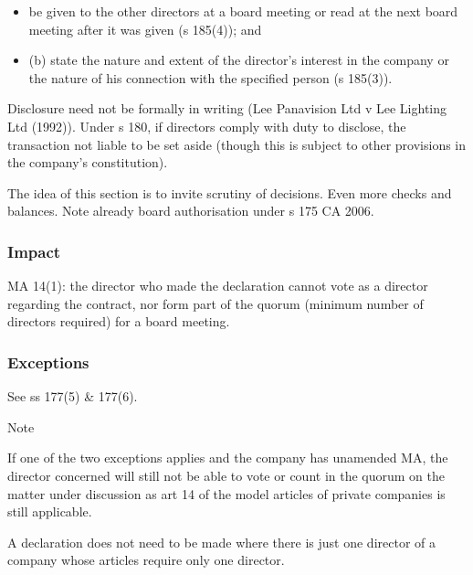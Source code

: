 \documentclass[
]{article}
\providecommand{\tightlist}{%
  \setlength{\itemsep}{0pt}\setlength{\parskip}{0pt}}
\newenvironment{env-1331fea0-f6a9-490d-abd5-c6befd8e7bfb}
{
    \savenotes\tcolorbox[blanker,breakable,left=5pt,borderline west={2pt}{-4pt}{blue}]
}
{
    \endtcolorbox\spewnotes
}
\begin{document}
\begin{itemize}
\begin{itemize}
    \begin{itemize}
    \tightlist
    \item
      be given to the other directors at a board meeting or read at the
      next board meeting after it was given (s 185(4)); and
    \item
      (b) state the nature and extent of the director's interest in the
      company or the nature of his connection with the specified person
      (s 185(3)).
    \end{itemize}
  \end{itemize}
\end{itemize}

Disclosure need not be formally in writing (Lee Panavision Ltd v Lee
Lighting Ltd (1992)). Under s 180, if directors comply with duty to
disclose, the transaction not liable to be set aside (though this is
subject to other provisions in the company's constitution).

The idea of this section is to invite scrutiny of decisions. Even more
checks and balances. Note already board authorisation under s 175 CA
2006.

\hypertarget{impact}{%
\subsubsection{Impact}\label{impact}}

MA 14(1): the director who made the declaration cannot vote as a
director regarding the contract, nor form part of the quorum (minimum
number of directors required) for a board meeting.

\hypertarget{exceptions}{%
\subsubsection{Exceptions}\label{exceptions}}

See ss 177(5) \& 177(6).

\begin{env-1331fea0-f6a9-490d-abd5-c6befd8e7bfb}

Note

If one of the two exceptions applies and the company has unamended MA,
the director concerned will still not be able to vote or count in the
quorum on the matter under discussion as art 14 of the model articles of
private companies is still applicable.

\end{env-1331fea0-f6a9-490d-abd5-c6befd8e7bfb}

A declaration does not need to be made where there is just one director
of a company whose articles require only one director.
\end{document}
